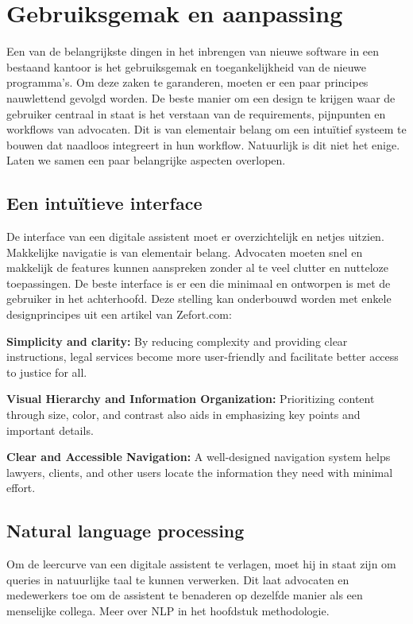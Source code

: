 \section{Gebruiksgemak en aanpassing}
Een van de belangrijkste dingen in het inbrengen van nieuwe software in een bestaand kantoor is het gebruiksgemak en toegankelijkheid van de nieuwe programma's. Om deze zaken te garanderen,
moeten er een paar principes nauwlettend gevolgd worden. De beste manier om een design te krijgen waar de gebruiker centraal in staat is het verstaan van de requirements, pijnpunten en
workflows van advocaten. Dit is van elementair belang om een intuïtief systeem te bouwen dat naadloos integreert in hun workflow. Natuurlijk is dit niet het enige.
Laten we samen een paar belangrijke aspecten overlopen.

\subsection{Een intuïtieve interface}
De interface van een digitale assistent moet er overzichtelijk en netjes uitzien. Makkelijke navigatie is van elementair belang. Advocaten moeten snel en makkelijk de features kunnen aanspreken
zonder al te veel clutter en nutteloze toepassingen. De beste interface is er een die minimaal en ontworpen is met de gebruiker in het achterhoofd. Deze stelling kan onderbouwd worden met enkele
designprincipes uit een artikel van Zefort.com:

\begin{displayquote}
	\textbf{Simplicity and clarity:}
	By reducing complexity and providing clear instructions, legal services become more user-friendly and facilitate better access to justice for all.
	\autocite{Zefort}

	\textbf{Visual Hierarchy and Information Organization:}
	Prioritizing content through size, color, and contrast also aids in emphasizing key points and important details.
	\autocite{Zefort}

	\textbf{Clear and Accessible Navigation:}
	A well-designed navigation system helps lawyers, clients, and other users locate the information they need with minimal effort.
	\autocite{Zefort}
\end{displayquote}

\subsection{Natural language processing}
Om de leercurve van een digitale assistent te verlagen, moet hij in staat zijn om queries in natuurlijke taal te kunnen verwerken. 
Dit laat advocaten en medewerkers toe om de assistent te benaderen op dezelfde manier als een menselijke collega. Meer over NLP in het hoofdstuk methodologie. 

